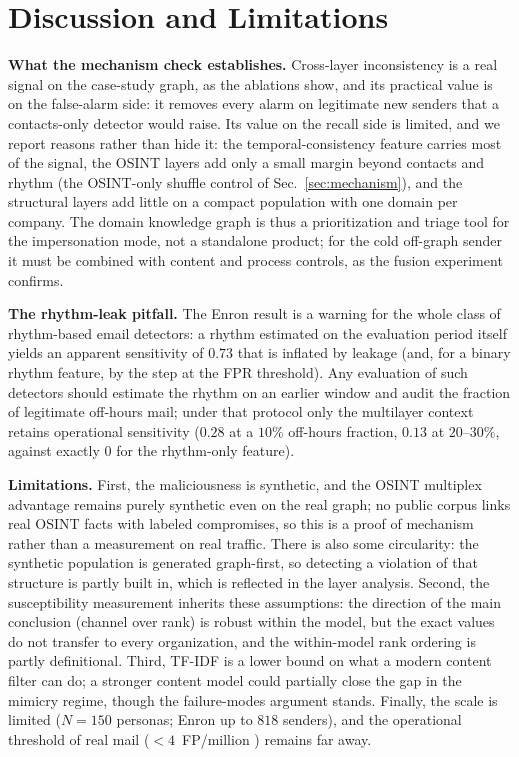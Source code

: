 \documentclass[conference]{IEEEtran}
\begin{document}
\section{Discussion and Limitations}
\label{sec:discussion}
\textbf{What the mechanism check establishes.} Cross-layer inconsistency is a real signal on the
case-study graph, as the ablations show, and its practical value is on the false-alarm side: it removes every alarm on legitimate
new senders that a contacts-only detector would raise. Its value on the recall side is limited, and we report
reasons rather than hide it: the temporal-consistency feature carries most of the signal, the OSINT layers
add only a small margin beyond contacts and rhythm (the OSINT-only shuffle control of
Sec.~\ref{sec:mechanism}), and the structural layers add little on a compact population with one domain per
company. The domain knowledge graph
is thus a prioritization and triage tool for the impersonation mode, not a standalone product; for the cold
off-graph sender it must be combined with content and process controls, as the fusion experiment confirms.

\textbf{The rhythm-leak pitfall.} The Enron result is a warning for the whole class of rhythm-based email
detectors: a rhythm estimated on the evaluation period itself yields an apparent sensitivity of $0.73$ that is
inflated by leakage (and, for a binary rhythm feature, by the step at the FPR threshold). Any evaluation of such detectors should estimate the rhythm on an earlier window and
audit the fraction of legitimate off-hours mail; under that protocol only the multilayer context retains
operational sensitivity ($0.28$ at a $10\%$ off-hours fraction, $0.13$ at $20$--$30\%$, against exactly $0$
for the rhythm-only feature).

\textbf{Limitations.} First, the maliciousness is synthetic, and the OSINT multiplex advantage remains purely
synthetic even on the real graph; no public corpus links real OSINT facts with labeled compromises, so this is
a proof of mechanism rather than a measurement on real traffic. There is also some circularity: the synthetic
population is generated graph-first, so detecting a violation of that structure is partly built in, which is
reflected in the layer analysis. Second, the susceptibility measurement inherits these assumptions: the
direction of the main conclusion (channel over rank) is robust within the model, but the exact values do not transfer to every organization, and the within-model rank ordering is
partly definitional. Third, TF-IDF is a lower bound on what a modern content filter can do; a stronger content
model could partially close the gap in the mimicry regime, though the failure-modes argument stands. Finally,
the scale is limited ($N{=}150$ personas; Enron up to $818$ senders), and the operational threshold of real
mail ($<\!4$~FP/million \cite{ho2019detecting}) remains far away.
\end{document}
